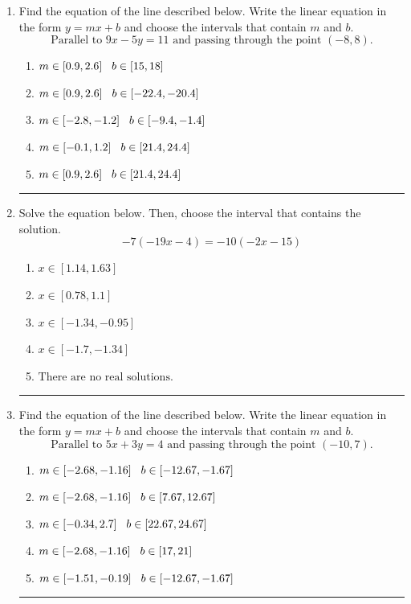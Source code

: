 \documentclass[14pt]{extbook}
\newcommand{\litem}[1]{\item#1\hspace*{-1cm}\rule{\textwidth}{0.4pt}}
\begin{document}
\begin{enumerate}
{\begin{enumerate}[label=\Alph*.]
\end{enumerate} }
\litem{
Find the equation of the line described below. Write the linear equation in the form $ y=mx+b $ and choose the intervals that contain $m$ and $b$.\[ \text{Parallel to } 9 x - 5 y = 11 \text{ and passing through the point } (-8, 8). \]\begin{enumerate}[label=\Alph*.]
\item \( m \in [0.9, 2.6] \hspace*{3mm} b \in [15, 18] \)
\item \( m \in [0.9, 2.6] \hspace*{3mm} b \in [-22.4, -20.4] \)
\item \( m \in [-2.8, -1.2] \hspace*{3mm} b \in [-9.4, -1.4] \)
\item \( m \in [-0.1, 1.2] \hspace*{3mm} b \in [21.4, 24.4] \)
\item \( m \in [0.9, 2.6] \hspace*{3mm} b \in [21.4, 24.4] \)

\end{enumerate} }
\litem{
Solve the equation below. Then, choose the interval that contains the solution.\[ -7(-19x -4) = -10(-2x -15) \]\begin{enumerate}[label=\Alph*.]
\item \( x \in [1.14, 1.63] \)
\item \( x \in [0.78, 1.1] \)
\item \( x \in [-1.34, -0.95] \)
\item \( x \in [-1.7, -1.34] \)
\item \( \text{There are no real solutions.} \)

\end{enumerate} }
\litem{
Find the equation of the line described below. Write the linear equation in the form $ y=mx+b $ and choose the intervals that contain $m$ and $b$.\[ \text{Parallel to } 5 x + 3 y = 4 \text{ and passing through the point } (-10, 7). \]\begin{enumerate}[label=\Alph*.]
\item \( m \in [-2.68, -1.16] \hspace*{3mm} b \in [-12.67, -1.67] \)
\item \( m \in [-2.68, -1.16] \hspace*{3mm} b \in [7.67, 12.67] \)
\item \( m \in [-0.34, 2.7] \hspace*{3mm} b \in [22.67, 24.67] \)
\item \( m \in [-2.68, -1.16] \hspace*{3mm} b \in [17, 21] \)
\item \( m \in [-1.51, -0.19] \hspace*{3mm} b \in [-12.67, -1.67] \)


\end{enumerate}}
\end{enumerate}
\end{document}
